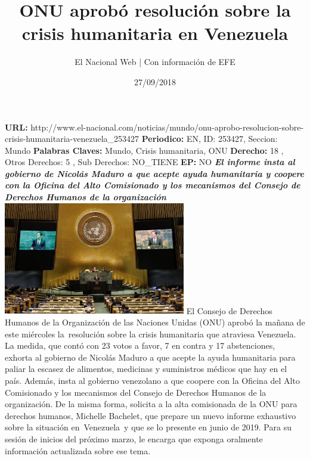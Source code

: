 \documentclass{article}%
\title{\textbf{ONU aprobó resolución sobre la crisis humanitaria en Venezuela}}%
\author{El Nacional Web | Con información de EFE}%
\date{27/09/2018}%
\begin{document}
%
\normalsize%
\maketitle%
\textbf{URL: }%
http://www.el{-}nacional.com/noticias/mundo/onu{-}aprobo{-}resolucion{-}sobre{-}crisis{-}humanitaria{-}venezuela\_253427\newline%
%
\textbf{Periodico: }%
EN, %
ID: %
253427, %
Seccion: %
Mundo\newline%
%
\textbf{Palabras Claves: }%
Mundo, Crisis humanitaria, ONU\newline%
%
\textbf{Derecho: }%
18%
, Otros Derechos: %
5%
, Sub Derechos: %
NO\_TIENE%
\newline%
%
\textbf{EP: }%
NO\newline%
\newline%
%
\textbf{\textit{El informe insta al gobierno de Nicolás Maduro a que acepte ayuda humanitaria y coopere con la Oficina del Alto Comisionado y los mecanismos del Consejo de Derechos Humanos de la organización~}}%
\newline%
\newline%
%
\includegraphics[width=300px]{233.jpg}%
\newline%
%
El Consejo de Derechos Humanos de la Organización de las Naciones Unidas (ONU) aprobó la mañana de este miércoles la~resolución sobre la crisis humanitaria que atraviesa Venezuela.%
\newline%
%
La medida, que contó con 23 votos a favor, 7 en contra y 17 abstenciones, exhorta al gobierno de Nicolás Maduro a que acepte la ayuda humanitaria para paliar la escasez de alimentos, medicinas y suministros médicos que hay en el país.%
\newline%
%
Además, insta al gobierno venezolano a que coopere con la Oficina del Alto Comisionado y los mecanismos del Consejo de Derechos Humanos de la organización.%
\newline%
%
De la misma forma, solicita a la alta comisionada de la ONU para derechos humanos, Michelle Bachelet, que prepare un nuevo informe exhaustivo sobre la situación en~Venezuela~y que se lo presente en junio de 2019. Para su sesión de inicios del próximo marzo, le encarga que exponga oralmente información actualizada sobre ese tema.%
\end{document}
